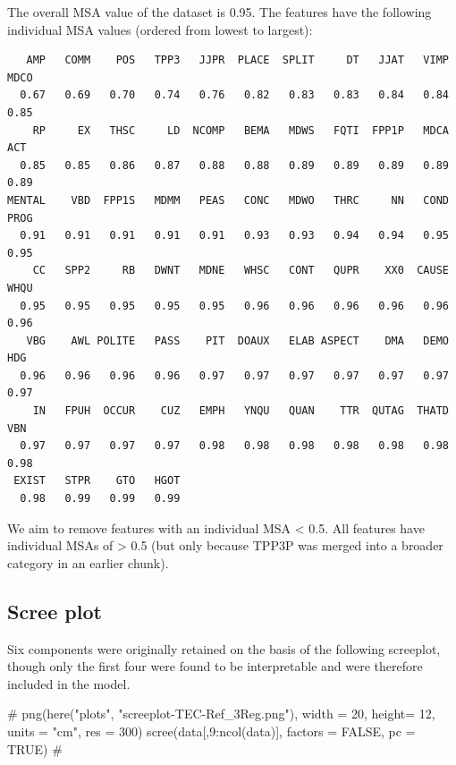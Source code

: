 \documentclass[
  letterpaper,
  DIV=11,
  numbers=noendperiod]{scrreprt}
\newenvironment{Shaded}{\begin{snugshade}}{\end{snugshade}}
\newcommand{\AttributeTok}[1]{\textcolor[rgb]{0.40,0.45,0.13}{#1}}
\newcommand{\CommentTok}[1]{\textcolor[rgb]{0.37,0.37,0.37}{#1}}
\newcommand{\ConstantTok}[1]{\textcolor[rgb]{0.56,0.35,0.01}{#1}}
\newcommand{\DecValTok}[1]{\textcolor[rgb]{0.68,0.00,0.00}{#1}}
\newcommand{\FunctionTok}[1]{\textcolor[rgb]{0.28,0.35,0.67}{#1}}
\newcommand{\NormalTok}[1]{\textcolor[rgb]{0.00,0.23,0.31}{#1}}
\newcommand{\SpecialCharTok}[1]{\textcolor[rgb]{0.37,0.37,0.37}{#1}}
\begin{document}
The overall MSA value of the dataset is 0.95. The features have the
following individual MSA values (ordered from lowest to largest):

\begin{Shaded}
\end{Shaded}

\begin{verbatim}
   AMP   COMM    POS   TPP3   JJPR  PLACE  SPLIT     DT   JJAT   VIMP   MDCO 
  0.67   0.69   0.70   0.74   0.76   0.82   0.83   0.83   0.84   0.84   0.85 
    RP     EX   THSC     LD  NCOMP   BEMA   MDWS   FQTI  FPP1P   MDCA    ACT 
  0.85   0.85   0.86   0.87   0.88   0.88   0.89   0.89   0.89   0.89   0.89 
MENTAL    VBD  FPP1S   MDMM   PEAS   CONC   MDWO   THRC     NN   COND   PROG 
  0.91   0.91   0.91   0.91   0.91   0.93   0.93   0.94   0.94   0.95   0.95 
    CC   SPP2     RB   DWNT   MDNE   WHSC   CONT   QUPR    XX0  CAUSE   WHQU 
  0.95   0.95   0.95   0.95   0.95   0.96   0.96   0.96   0.96   0.96   0.96 
   VBG    AWL POLITE   PASS    PIT  DOAUX   ELAB ASPECT    DMA   DEMO    HDG 
  0.96   0.96   0.96   0.96   0.97   0.97   0.97   0.97   0.97   0.97   0.97 
    IN   FPUH  OCCUR    CUZ   EMPH   YNQU   QUAN    TTR  QUTAG  THATD    VBN 
  0.97   0.97   0.97   0.97   0.98   0.98   0.98   0.98   0.98   0.98   0.98 
 EXIST   STPR    GTO   HGOT 
  0.98   0.99   0.99   0.99 
\end{verbatim}

We aim to remove features with an individual MSA \textless{} 0.5. All
features have individual MSAs of \textgreater{} 0.5 (but only because
TPP3P was merged into a broader category in an earlier chunk).

\subsection{Scree plot}\label{scree-plot}

Six components were originally retained on the basis of the following
screeplot, though only the first four were found to be interpretable and
were therefore included in the model.

\begin{Shaded}
\begin{Highlighting}[]
\CommentTok{\# png(here("plots", "screeplot{-}TEC{-}Ref\_3Reg.png"), width = 20, height= 12, units = "cm", res = 300)}
\FunctionTok{scree}\NormalTok{(data[,}\DecValTok{9}\SpecialCharTok{:}\FunctionTok{ncol}\NormalTok{(data)], }\AttributeTok{factors =} \ConstantTok{FALSE}\NormalTok{, }\AttributeTok{pc =} \ConstantTok{TRUE}\NormalTok{) }\CommentTok{\# }
\end{Highlighting}
\end{Shaded}
\end{document}
